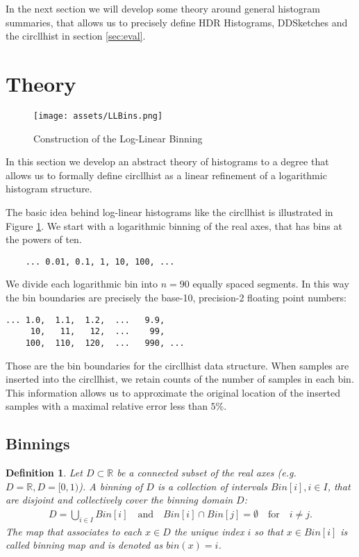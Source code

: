 \documentclass{article}
\theoremstyle{plain}
\newtheorem{definition}{Definition}[section]
\theoremstyle{remark}
\newcommand{\IR}{\mathbb{R}}
\newcommand{\Union}{\bigcup}
\newcommand{\qtext}[1]{\quad\text{#1}\quad} %
\begin{document}
In the next section we will develop some theory around general histogram summaries, that allows us
to precisely define HDR Histograms, DDSketches and the circllhist in section \ref{sec:eval}.

\section{Theory}

\begin{figure}
  \texttt{[image: assets/LLBins.png]}
  \caption{Construction of the Log-Linear Binning}
  \label{fig:llbins}
\end{figure}

In this section we develop an abstract theory of histograms to a degree that allows us to
formally define circllhist as a linear refinement of a logarithmic histogram structure.

The basic idea behind log-linear histograms like the circllhist is illustrated in Figure \ref{fig:llbins}.
We start with a logarithmic binning of the real axes, that has bins at the powers of ten.
\begin{center}
  \begin{BVerbatim}
    ... 0.01, 0.1, 1, 10, 100, ...
  \end{BVerbatim}
\end{center}
We divide each logarithmic bin into $n=90$ equally spaced segments. In this way the bin boundaries
are precisely the base-10, precision-2 floating point numbers:
\begin{center}
\begin{BVerbatim}
... 1.0,  1.1,  1.2,  ...   9.9,
     10,   11,   12,  ...    99,
    100,  110,  120,  ...   990, ...
\end{BVerbatim}
\end{center}
Those are the bin boundaries for the circllhist data structure.
When samples are inserted into the circllhist, we retain counts of the number of samples in each bin.
This information allows us to approximate the original location of the inserted samples with a
maximal relative error less than $5\%$.

\subsection{Binnings}

\begin{definition}
  Let $D \subset \IR$ be a connected subset of the real axes (e.g. $D=\IR, D=[0,1)$).
  A binning of $D$ is a collection of intervals $Bin[i], i \in I$, that are disjoint and collectively cover the binning domain $D$:
  \begin{align*}
    D = \Union_{i\in I} Bin[i] \qtext{and} Bin[i] \cap Bin[j] = \emptyset \qtext{for} i \neq j.
  \end{align*}
  The map that associates to each $x \in D$ the unique index $i$ so that $x \in Bin[i]$ is called
  binning map and is denoted as $bin(x) = i$.
\end{definition}
\end{document}
